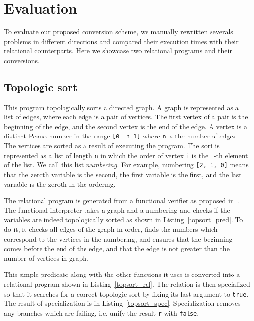 \section{Evaluation}

To evaluate our proposed conversion scheme, we manually rewritten severals problems in different directions and compared their execution times with their relational counterparts.
Here we showcase two relational programs and their conversions.





\subsection{Topologic sort}

This program topologically sorts a directed graph.
A graph is represented as a list of edges, where each edge is a pair of vertices.
The first vertex of a pair is the beginning of the edge, and the second vertex is the end of the edge.
A vertex is a distinct Peano number in the range \lstinline{[0..n-1]} where \lstinline{n} is the number of edges.
The vertices are sorted as a result of executing the program.
The sort is represented as a list of length \lstinline{n} in which the order of vertex \lstinline{i} is the \lstinline{i}-th element of the list.
We call this list \emph{numbering}.
For example, numbering \lstinline{[2, 1, 0]} means that the zeroth variable is the second, the first variable is the first, and the last variable is the zeroth in the ordering.

The relational program is generated from a functional verifier as proposed in~\cite{lozov2019relational}.
The functional interpreter takes a graph and a numbering and checks if the variables are indeed topologically sorted as shown in Listing~\ref{topsort_pred}.
To do it, it checks all edges of the graph in order, finds the numbers which correspond to the vertices in the numbering, and ensures that the beginning comes before the end of the edge, and that the edge is not greater than the number of vertices in graph.

This simple predicate along with the other functions it uses is converted into a relational program shown in Listing~\ref{topsort_rel}.
The relation is then specialized so that it searches for a correct topologic sort by fixing its last argument to \lstinline{true}.
The result of specialization is in Listing~\ref{topsort_spec}.
Specialization removes any \conde branches which are failing, i.e. unify the result \lstinline{r} with \lstinline{false}.

